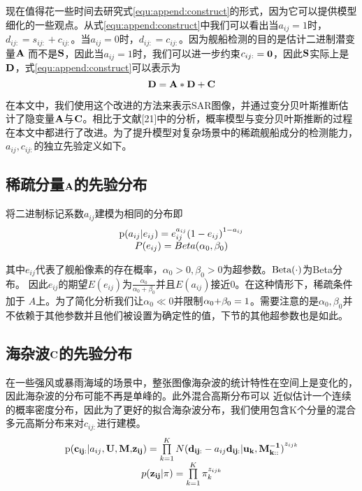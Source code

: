 现在值得花一些时间去研究式\ref{equ:append:construct}的形式，因为它可以提供模型细化的一些观点。从式\ref{equ:append:construct}中我们可以看出当$a_{ij}=1$时，$d_{ij:}=s_{ij:}+c_{ij:}$。当$a_{ij}=0$时，$d_{ij:}=c_{ij:}$。因为舰船检测的目的是估计二进制潜变量$\bf{A}$
而不是$\bf{S}$，因此当$a_{ij}=1$时，我们可以进一步约束$c_{ij:}=\bf{0}$，因此$\bf{S}$实际上是$\bf{D}$，式\ref{equ:append:construct}可以表示为
\begin{equation}
   \label{equ:append:refine}
   {\bf{D = A*D + C}} 
\end{equation}

在本文中，我们使用这个改进的方法来表示SAR图像，并通过变分贝叶斯推断估计了隐变量$\bf{A}$与$\bf{C}$。相比于文献[21]中的分析，概率模型与变分贝叶斯推断的过程在本文中都进行了改进。为了提升模型对复杂场景中的稀疏舰船成分的检测能力，$a_{ij},c_{ij:}$的独立先验定义如下。
\subsection{稀疏分量$\bf{A}$的先验分布}
将二进制标记系数$a_{ij}$建模为相同的分布即
    \begin{equation}
        \label{equ:append:priora}
        \begin{array}{*{20}{c}}
        {{\rm{p}}({a_{ij}}|{e_{ij}}) = e_{ij}^{{a_{ij}}}{{(1 - {e_{ij}})}^{1 - {a_{ij}}}}}\\
        {P({e_{ij}}) = Beta({\alpha _0},{\beta _0})}
        \end{array}
    \end{equation}

其中$e_{ij}$代表了舰船像素的存在概率，$\alpha_0>0, \beta_0>0$为超参数。$\rm{Beta(\cdot)}$为Beta分布。
因此$e_{ij}$的期望$E(e_{ij})$为$\frac{{{\alpha _0}}}{{{\alpha _0} + {\beta _0}}}$并且$E(a_{ij})$接近0。在这种情形下，稀疏条件加于
$A$上。为了简化分析我们让${\alpha _0} \ll 0$并限制${\alpha _0}{\rm{ + }}{\beta _0} = 1$。需要注意的是$\alpha_0,\beta_0$并不依赖于其他参数并且他们被设置为确定性的值，下节的其他超参数也是如此。

\subsection{海杂波$\bf{C}$的先验分布}
在一些强风或暴雨海域的场景中，整张图像海杂波的统计特性在空间上是变化的，因此海杂波的分布可能不再是单峰的。此外混合高斯分布可以
近似估计一个连续的概率密度分布，因此为了更好的拟合海杂波分布，我们使用包含K个分量的混合多元高斯分布来对$c_{ij:}$进行建模。
    \begin{equation}
        \label{equ:append:clutter_distribution}
        \begin{array}{*{20}{c}}
        {{\rm{p}}({{\bf{c}}_{{\bf{ij:}}}}|{a_{ij}},{\bf{U,M,}}{{\bf{z}}_{{\bf{ij}}}}) = \prod\limits_{k = 1}^K {N{{({{\bf{d}}_{{\bf{ij:}}}} - {a_{ij}}{{\bf{d}}_{{\bf{ij:}}}}|{{\bf{u}}_{\bf{k}}}{\bf{,M}}_{{\bf{k::}}}^{{\bf{ - 1}}})}^{{z_{ijk}}}}} }\\
        {p({{\bf{z}}_{{\bf{ij}}}}|\pi ) = \prod\limits_{k = 1}^K {\pi _k^{{z_{ijk}}}} }
        \end{array}
    \end{equation}

